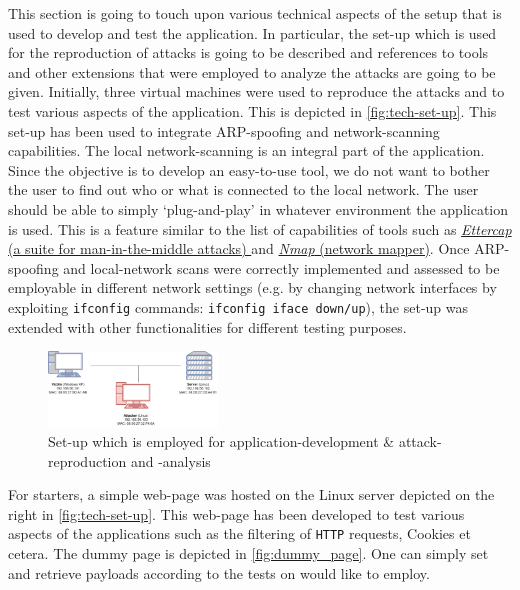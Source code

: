 This section is going to touch upon various technical aspects of the setup that is used to develop and test the application. In particular, the set-up which is used for the reproduction of attacks is going to be described and references to tools and other extensions that were employed to analyze the attacks are going to be given.
Initially, three virtual machines were used to reproduce the attacks and to test various aspects of the application. This is depicted in \autoref{fig:tech-set-up}. This set-up has been used to integrate ARP-spoofing and network-scanning capabilities. The local network-scanning is an integral part of the application. Since the objective is to develop an easy-to-use tool, we do not want to bother the user to find out who or what is connected to the local network. The user should be able to simply `plug-and-play' in whatever environment the application is used. This is a feature similar to the list of capabilities of tools such as \href{https://github.com/Ettercap/ettercap}{\textit{Ettercap} (a suite for man-in-the-middle attacks) } and \href{https://github.com/nmap/nmap}{\textit{Nmap} (network mapper)}. Once ARP-spoofing and local-network scans were correctly implemented and assessed to be employable in different network settings (e.g. by changing network interfaces by exploiting \texttt{ifconfig} commands: \texttt{ifconfig iface down/up}), the set-up was extended with other functionalities for different testing purposes. 

\begin{figure}[t!]
	\centering
	\includegraphics[width=0.4\textwidth]{img/tech_set_up.png}
	\caption{
		Set-up which is employed for application-development \& attack-reproduction and -analysis }
	\label{fig:tech-set-up}
\end{figure}

For starters, a simple web-page was hosted on the Linux server depicted on the right in \autoref{fig:tech-set-up}. This web-page has been developed to test various aspects of the applications such as the filtering of \texttt{HTTP} requests, Cookies et cetera. The dummy page is depicted in \autoref{fig:dummy_page}. One can simply set and retrieve payloads according to the tests on would like to employ.\\

